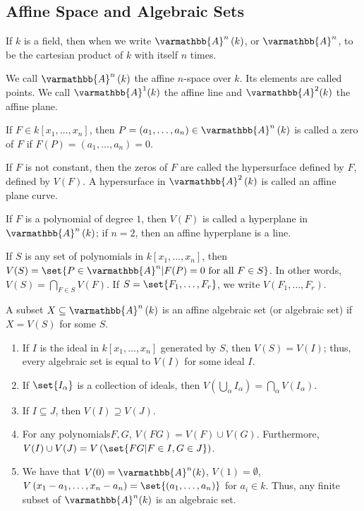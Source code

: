 \documentclass[10pt]{mypackage}
\renewcommand*{\mathbb}[1]{\varmathbb{#1}}
\newcommand{\A}{\mathbb{A}}
\begin{document}
\subsection{Affine Space and Algebraic Sets}%
\begin{definition}
  If $k$ is a field, then when we write $\mathbb{A}^n\left(k\right)$, or $\mathbb{A}^n$, to be the cartesian product of $k$ with itself $n$ times.\newline

  We call $\mathbb{A}^n\left(k\right)$ the affine $n$-space over $k$. Its elements are called points. We call $\mathbb{A}^1(k)$ the affine line and $\A^2(k)$ the affine plane.
\end{definition}
\begin{definition}
  If $F\in k\left[x_1,\dots,x_n\right]$, then $P = \left(a_1,\dots,a_n\right)\in \A^n\left(k\right)$ is called a zero of $F$ if $F(P) = \left(a_1,\dots,a_n\right) = 0$.\newline

  If $F$ is not constant, then the zeros of $F$ are called the hypersurface defined by $F$, defined by $V(F)$. A hypersurface in $\A^2\left(k\right)$ is called an affine plane curve.\newline

  If $F$ is a polynomial of degree $1$, then $V(F)$ is called a hyperplane in $\A^n\left(k\right)$; if $n = 2$, then an affine hyperplane is a line.
\end{definition}
\begin{definition}
  If $S$ is any set of polynomials in $k\left[x_1,\dots,x_n\right]$, then $V(S) = \set{P\in \A^n | F(P) = 0\text{ for all }F\in S}$. In other words, $V(S) = \bigcap_{F\in S}V(F)$. If $S = \set{F_1,\dots,F_r}$, we write $V\left(F_1,\dots,F_r\right)$.\newline

  A subset $X\subseteq \A^n\left(k\right)$ is an affine algebraic set (or algebraic set) if $X = V(S)$ for some $S$.
\end{definition}
\begin{proposition}\hfill
  \begin{enumerate}[(1)]
    \item If $I$ is the ideal in $k\left[x_1,\dots,x_n\right]$ generated by $S$, then $V(S) = V(I)$; thus, every algebraic set is equal to $V(I)$ for some ideal $I$.
    \item If $\set{I_{\alpha}}$ is a collection of ideals, then $V\left(\bigcup_{\alpha}I_{\alpha}\right) = \bigcap_{\alpha}V\left(I_{\alpha}\right)$.
    \item If $I\subseteq J$, then $V(I)\supseteq V(J)$.
    \item For any polynomials$F,G$, $V\left(FG\right) = V\left(F\right)\cup V\left(G\right)$. Furthermore, $V(I)\cup V(J) = V\left(\set{FG | F\in I, G\in J}\right)$.
    \item We have that $V(0) = \A^n(k)$, $V(1) = \emptyset$, $V\left(x_1-a_1,\dots,x_n-a_n\right) = \set{(a_1,\dots,a_n)}$ for $a_i\in k$. Thus, any finite subset of $\A^n(k)$ is an algebraic set.
  \end{enumerate}
\end{proposition}
\end{document}
